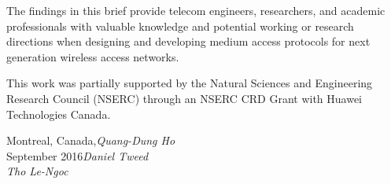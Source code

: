 The findings in this brief provide telecom engineers, researchers, and academic professionals with valuable knowledge and potential working or research directions when designing and developing medium access protocols for next generation wireless access networks.

This work was partially supported by the Natural Sciences and Engineering Research Council (NSERC) through an NSERC CRD Grant with Huawei Technologies Canada.

\vspace{\baselineskip}
\begin{flushright}\noindent
Montreal, Canada,\hfill {\it Quang-Dung Ho}\\
September 2016\hfill {\it Daniel Tweed}\\
\hfill {\it Tho Le-Ngoc}\\
\end{flushright}